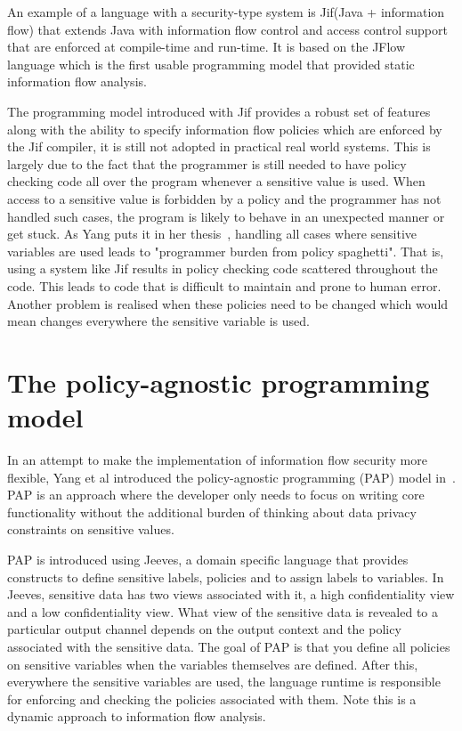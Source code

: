 An example of a language with a security-type system is Jif(Java + information flow)
\cite{jifurl} that extends Java with information flow control and access control support
that are enforced at compile-time and run-time. It is based on the JFlow language
\cite{Jflow} which is the first usable programming model that provided static
information flow analysis.

The programming model introduced with Jif provides a robust set of features along
with the ability to specify information flow policies which are enforced by the Jif
compiler, it is still not adopted in practical real world systems. This is largely
due to the fact that the programmer is still needed to have policy checking code
all over the program whenever a sensitive value is used. When access to a sensitive
value is forbidden by a policy and the programmer has not handled such cases, the
program is likely to behave in an unexpected manner or get stuck. As Yang puts it
in her thesis~\cite{YangPhd}, handling all cases where sensitive variables are used
leads to "programmer burden from policy spaghetti". That is, using a system like
Jif results in policy checking code scattered throughout the code. This leads to
code that is difficult to maintain and prone to human error. Another problem is
realised when these policies need to be changed which would mean changes everywhere
the sensitive variable is used.

\section{The policy-agnostic programming model}
In an attempt to make the implementation of information flow security more flexible,
Yang et al introduced the policy-agnostic programming (PAP) model in~\cite{Jeeves}.
PAP is an approach where the developer only needs to focus on writing core functionality
without the additional burden of thinking about data privacy constraints on sensitive
values.

PAP is introduced using Jeeves, a domain specific language that provides constructs
to define sensitive labels, policies and to assign labels to variables. In Jeeves,
sensitive data has two views associated with it, a high confidentiality view and a
low confidentiality view. What view of the sensitive data is revealed to a particular
output channel depends on the output context and the policy associated with the
sensitive data. The goal of PAP is that you define all policies on sensitive variables
when the variables themselves are defined. After this, everywhere the sensitive variables
are used, the language runtime is responsible for enforcing and checking the policies
associated with them. Note this is a dynamic approach to information flow analysis.

